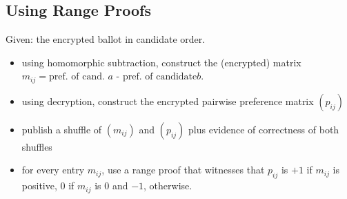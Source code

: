 \documentclass{llncs}
\begin{document}
\subsection{Using Range Proofs}

Given: the encrypted ballot in candidate order.

\begin{itemize}
\item using homomorphic subtraction, construct the (encrypted)
matrix $m_{ij} = \mbox{pref. of cand. $a$ - pref. of candidate
$b$}$.
\item using decryption, construct the encrypted pairwise preference
matrix $(p_{ij})$
\item publish a shuffle of $(m_{ij})$ and $(p_{ij})$ plus evidence of correctness
of both shuffles
\item for every entry $m_{ij}$, use a range proof that witnesses
that $p_{ij}$ is $+1$ if $m_{ij}$ is positive, $0$ if $m_{ij}$ is
$0$ and $-1$, otherwise.
\end{itemize}
\end{document}
